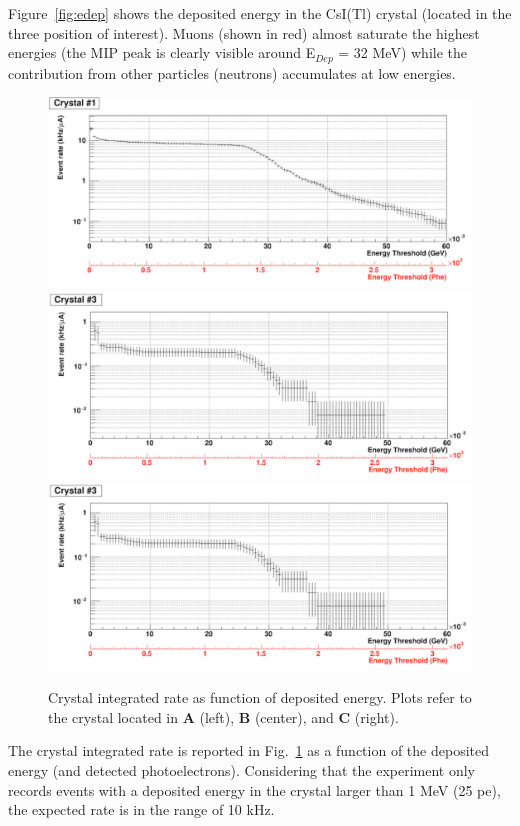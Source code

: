 Figure~\ref{fig:edep} shows the deposited energy in the CsI(Tl) crystal (located in the three  position of interest).  Muons (shown in red) almost saturate the highest energies (the MIP peak is clearly visible around E$_{Dep}$ = 32 MeV) while the contribution from other particles (neutrons) accumulates at low energies.
\begin{figure}[h!] 
\center
\includegraphics[width=12.0cm]{figs/int-rate-E1.pdf} 
\includegraphics[width=12.0cm]{figs/int-rate-E2.pdf} 
\includegraphics[width=12.0cm]{figs/int-rate-E3.pdf}
\caption {Crystal integrated rate as function of deposited energy.
Plots refer to the crystal located in {\bf A} (left),  {\bf B} (center), and {\bf C} (right).}
\label{fig:int-rates-E}
\end{figure}

The crystal  integrated rate is reported in Fig.~\ref{fig:int-rates-E}  as a function of the deposited energy (and detected photoelectrons). Considering that  the experiment only records events 
with a deposited energy in the crystal  larger than  1 MeV (25 pe), the expected rate is in the range of 10 kHz.

